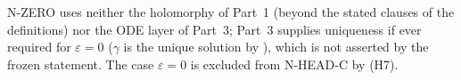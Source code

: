 \begin{remark}[Scope]\label{bpN:p2:zero-scope}
N-ZERO uses neither the holomorphy of Part~1 (beyond the stated clauses of the definitions) nor the ODE layer of Part~3; Part~3 supplies uniqueness if ever required for $\varepsilon=0$ ($\gamma$ is the unique solution by ), which is not asserted by the frozen statement. The case $\varepsilon=0$ is excluded from N-HEAD-C by (H7).
\end{remark}
\endgroup
